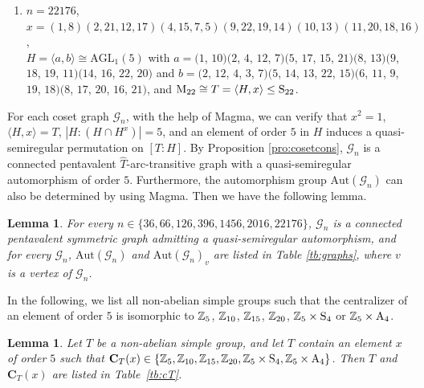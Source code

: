 \documentclass[12pt,reqno]{amsart}
\newcommand\A{\mathrm{A}} \newcommand\AGL{\mathrm{AGL}} \newcommand\AGammaL{\mathrm{A\Gamma L}} \newcommand\Alt{\mathrm{Alt}} \newcommand\ASL{\mathrm{ASL}} \newcommand\ASigmaL{\mathrm{A \Sigma L}} \newcommand\Aut{\mathrm{Aut}}
\def\C{\mathbf{C}}   \newcommand\Cay{\mathrm{Cay}}   \newcommand\Cos{\mathrm{Cos}} \newcommand{\CGammaSp}{\mathrm{C\Gamma Sp}}
\newcommand\M{\mathrm{M}} \newcommand{\magma}{{\sc Magma}} \renewcommand \mod{{\rm mod~}}
\newcommand{\cG}{\mathcal{G}}
\numberwithin {equation} {section}
\newtheorem{lemma}[theorem]{Lemma}
\begin{document}
\begin{enumerate}[\rm (i)]
\item $n=22176$, $x=(1, 8)(2, 21, 12, 17) (4, 15, 7, 5)(9, 22, 19, 14)(10, 13)(11, 20, 18, 16)$, \\ $H=\langle a,b\rangle\cong\AGL_{1}(5)$  with $a=(1$, $10)(2$, $4$, $12$, $7)(5$, $17$, $15$, $21)(8$, $13)(9$, $18$, $19$, $11)(14$, $16$, $22$, $20)$ and $b=(2$, $12$, $4$, $3$, $7)(5$, $14$, $13$, $22$, $15)(6$, $11$, $9$, $19$, $18)(8$, $17$, $20$, $16$, $21)$, and
$\M_{22}\cong T=\langle H,x\rangle\leq  \Sy_{22}$.
\end{enumerate}

\medskip

For each coset graph $\cG_n$,  with the help of  {\sc Magma}, we can verify that $x^2=1$, $\langle H,x\rangle=T$, $|H{:}(H\cap H^x)|=5$, and an element of order $5$ in $H$ induces a quasi-semiregular permutation on $[T{:}H]$. By  Proposition \ref{pro:cosetcons}, $\cG_n$  is a connected pentavalent $\hat{T}$-arc-transitive graph with a quasi-semiregular automorphism of order $5$. Furthermore, the automorphism group $\Aut(\cG_n)$ can also be determined by using {\sc Magma}. Then we have the following lemma.

\begin{lemma}\label{lm:examples}
For every $n  \in \{ 36,66,126,396,1456,2016,22176\}$, $\cG_n$ is a connected pentavalent symmetric graph admitting a quasi-semiregular automorphism, and for every $\cG_n$, $\Aut(\cG_n)$ and $\Aut(\cG_n)_v $ are listed in Table \ref{tb:graphs}, where  $v$ is a vertex of $ \cG_n$.
\end{lemma}

In the following, we list all non-abelian simple groups such that the centralizer of an element of order $5$ is isomorphic to $\mathbb{Z}_5$, $\mathbb{Z}_{10}$, $\mathbb{Z}_{15}$, $\mathbb{Z}_{20}$, $\mathbb{Z}_5 \times\mathrm{S}_4$ or $\ZZ_5 \times \A_4$.

\begin{lemma}\label{lm:TCpair}
Let $T$ be a non-abelian simple group, and let $T$ contain an  element $x$ of order $5$ such that $\C_T(x) \in \{ \ZZ_5,\ZZ_{10},\ZZ_{15},\ZZ_{20},\ZZ_5 \times\Sy_4, \ZZ_5 \times \A_4\}$. Then $T$ and $\C_T(x) $ are listed in  Table~\ref{tb:cT}.
\end{lemma}
\end{document}
